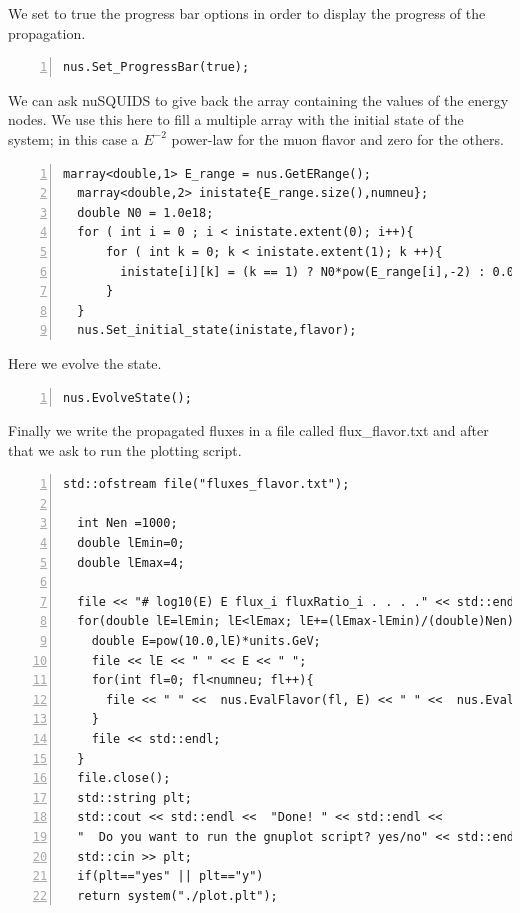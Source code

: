 \documentclass[3p,12pt]{elsarticle}
\newcommand{\ttf}{\ttfamily}
\begin{document}
We set to {\ttf true} the progress bar options in order to display the
progress of the propagation.

\begin{lstlisting}[frame=leftline, numbers = left,breaklines=true,label = ex:sin1,firstnumber=last]
  nus.Set_ProgressBar(true);
\end{lstlisting}

We can ask nuSQUIDS to give back the array containing the values of
the energy nodes. We use this here to fill a multiple array with the initial
state of the system; in this case a $E^{-2}$ power-law for the muon
flavor and zero for the others.
 
\begin{lstlisting}[frame=leftline, numbers = left,breaklines=true,label = ex:sin1,firstnumber=last]
  marray<double,1> E_range = nus.GetERange();
  marray<double,2> inistate{E_range.size(),numneu};
  double N0 = 1.0e18;
  for ( int i = 0 ; i < inistate.extent(0); i++){
      for ( int k = 0; k < inistate.extent(1); k ++){
        inistate[i][k] = (k == 1) ? N0*pow(E_range[i],-2) : 0.0;
      }
  }
  nus.Set_initial_state(inistate,flavor);
\end{lstlisting}

Here we evolve the state.

\begin{lstlisting}[frame=leftline, numbers = left,breaklines=true,label = ex:sin1,firstnumber=last]
  nus.EvolveState();
\end{lstlisting}

Finally we write the propagated fluxes in a file called {\ttf
  flux\_flavor.txt} and after that we ask to run the plotting script.

\begin{lstlisting}[frame=leftline, numbers = left,breaklines=true,label = ex:sin1,firstnumber=last]
  std::ofstream file("fluxes_flavor.txt");
  
  int Nen =1000;
  double lEmin=0;
  double lEmax=4;
  
  file << "# log10(E) E flux_i fluxRatio_i . . . ." << std::endl;
  for(double lE=lEmin; lE<lEmax; lE+=(lEmax-lEmin)/(double)Nen){
    double E=pow(10.0,lE)*units.GeV;
    file << lE << " " << E << " ";
    for(int fl=0; fl<numneu; fl++){
      file << " " <<  nus.EvalFlavor(fl, E) << " " <<  nus.EvalFlavor(fl, E)/(N0*pow(E,-2));
    }
    file << std::endl;
  }
  file.close();
  std::string plt;
  std::cout << std::endl <<  "Done! " << std::endl <<
  "  Do you want to run the gnuplot script? yes/no" << std::endl;
  std::cin >> plt;
  if(plt=="yes" || plt=="y")
  return system("./plot.plt");
\end{lstlisting}
\end{document}
